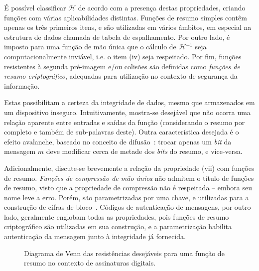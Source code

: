 \documentclass[12pt]{report}
\newcommand{\hh}{\mathcal{H}}
\def\precircle{(0.00, 0) circle (1.25cm)}
\def\seccircle{(1.75, 0) circle (1.25cm)}
\def\colcircle{(1.75, 0) circle (0.75cm)}
\begin{document}
É possível classificar $\hh{}$ de acordo com a presença destas propriedades,
criando funções com várias aplicabilidades distintas. Funções de
resumo simples contêm apenas os três primeiros itens, e são utilizadas em
vários âmbitos, em especial na estrutura de dados chamada de tabela de
espalhamento. Por outro lado, é imposto para uma função de mão única que
o cálculo de $\hh{}^{-1}$ seja computacionalmente inviável, i.e. o item (iv)
seja respeitado. Por fim, funções resistentes à segunda pré-imagem e/ou colisões
são definidas como \emph{funções de resumo criptográfico}, adequadas para
utilização no contexto de segurança da informação. 

Estas possibilitam a certeza da integridade de dados, mesmo que armazenados em
um dispositivo inseguro. Intuitivamente, mostra-se desejável que não ocorra
uma relação aparente entre entradas e saídas da função (considerando o resumo
por completo e também de sub-palavras deste). Outra característica desejada
é o efeito avalanche, baseado no conceito de
difusão~\cite{Stallings:2010:CNS:1824151}: trocar apenas um \emph{bit} da
mensagem $m$ deve modificar cerca de metade dos \emph{bits} do resumo, e
vice-versa.

Adicionalmente, discute-se brevemente a relação da propriedade (vii) com funções
de resumo. \emph{Funções de compressão de mão única} não admitem o título de funções
de resumo, visto que a propriedade de compressão não é respeitada -- embora seu
nome leve a erro. Porém, são parametrizadas por uma chave, e utilizadas para a
construção de cifras de bloco~\cite[9.25]{Menezes:1996:HAC:548089}. Códigos de
autenticação de mensagens, por outro lado, geralmente englobam todas as
propriedades, pois funções de resumo criptográfico são utilizadas em sua construção,
e a parametrização habilita autenticação da mensagem junto à integridade já
fornecida.

\begin{figure}[h]
  \centering
  \caption{Diagrama de Venn das resistências desejáveis para uma função de
    resumo no contexto de assinaturas digitais.}
  \label{fig:1}
\end{figure}
\end{document}
